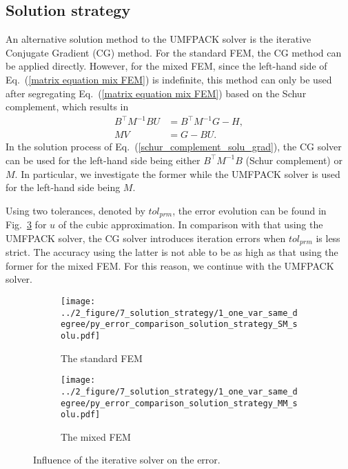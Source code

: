 \documentclass[review,3p]{elsarticle}
\begin{document}
\newpage
\subsection{Solution strategy}		\label{section_solver}
An alternative solution method to the UMFPACK solver is the iterative Conjugate Gradient (CG) method.
For the standard FEM, the CG method can be applied directly. However, for the mixed FEM, since the left-hand side of Eq.~(\ref{matrix equation mix FEM}) is indefinite, this method can only be used after segregating Eq.~(\ref{matrix equation mix FEM}) based on the Schur complement, which results in
\begin{subequations}
 \begin{align}
  B^{\top} M^{-1} B U &= B^{\top} M^{-1} G - H, 	\label{schur_complement_solution} \\
  MV&=G-BU.						\label{schur_complement_gradient}
\end{align}						\label{schur_complement_solu_grad}%
\end{subequations}
In the solution process of Eq.~(\ref{schur_complement_solu_grad}), the CG solver can be used for the left-hand side being either $B^{\top}M^{-1}B$ (Schur complement) or $M$. In particular, we investigate the former while the UMFPACK solver is used for the left-hand side being $M$.  

Using two tolerances, denoted by $tol_{prm}$, the error evolution can be found in Fig.~\ref{py_bench_Pois_error_solution_strategy} for $u$ of the cubic approximation. In comparison with that using the UMFPACK solver, the CG solver introduces iteration errors when $tol_{prm}$ is less strict. The accuracy using the latter is not able to be as high as that using the former for the mixed FEM. For this reason, we continue with the UMFPACK solver.

\begin{figure}[!ht]
	\centering
    \begin{subfigure}{6.0cm}
        \texttt{[image: ../2\_figure/7\_solution\_strategy/1\_one\_var\_same\_degree/py\_error\_comparison\_solution\_strategy\_SM\_solu.pdf]}
        \caption{The standard FEM}
        \label{py_bench_Pois_SM_error_solution_strategy_solu}
    \end{subfigure}
    \hspace{-0.2cm}
    \begin{subfigure}{6.0cm}	                		 	
        \texttt{[image: ../2\_figure/7\_solution\_strategy/1\_one\_var\_same\_degree/py\_error\_comparison\_solution\_strategy\_MM\_solu.pdf]}
        \caption{The mixed FEM}
        \label{py_bench_Pois_MM_error_solution_strategy_solu}
    \end{subfigure}
\caption{Influence of the iterative solver on the error.}
\label{py_bench_Pois_error_solution_strategy}
\end{figure}
\end{document}
